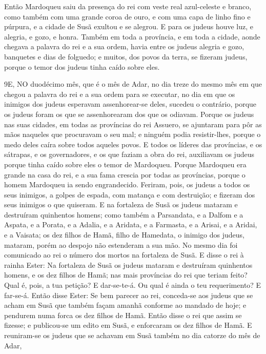 Então Mardoqueu saiu da presença do rei com veste real
azul-celeste e branco, como também com uma grande coroa de ouro, e
com uma capa de linho fino e púrpura, e a cidade de Susã exultou e
se alegrou. E para os judeus houve luz, e alegria, e gozo, e
honra. Também em toda a província, e em toda a cidade, aonde
chegava a palavra do rei e a sua ordem, havia entre os judeus
alegria e gozo, banquetes e dias de folguedo; e muitos, dos povos da
terra, se fizeram judeus, porque o temor dos judeus tinha caído
sobre eles.

\medskip

\lettrine{9} E, NO duodécimo mês, que é o mês de Adar, no dia
treze do mesmo mês em que chegou a palavra do rei e a sua ordem para
se executar, no dia em que os inimigos dos judeus esperavam
assenhorear-se deles, sucedeu o contrário, porque os judeus foram os
que se assenhorearam dos que os odiavam. Porque os judeus nas
suas cidades, em todas as províncias do rei Assuero, se ajuntaram
para pôr as mãos naqueles que procuravam o seu mal; e ninguém podia
resistir-lhes, porque o medo deles caíra sobre todos aqueles povos.
E todos os líderes das províncias, e os sátrapas, e os
governadores, e os que faziam a obra do rei, auxiliavam os judeus
porque tinha caído sobre eles o temor de Mardoqueu. Porque
Mardoqueu era grande na casa do rei, e a sua fama crescia por todas
as províncias, porque o homem Mardoqueu ia sendo engrandecido.
Feriram, pois, os judeus a todos os seus inimigos, a golpes de
espada, com matança e com destruição; e fizeram dos seus inimigos o
que quiseram. E na fortaleza de Susã os judeus mataram e
destruíram quinhentos homens; como também a Parsandata, e a
Dalfom e a Aspata, e a Porata, e a Adalia, e a Aridata, e a
Farmasta, e a Arisai, e a Aridai, e a Vaisata; os dez filhos
de Hamã, filho de Hamedata, o inimigo dos judeus, mataram, porém ao
despojo não estenderam a sua mão. No mesmo dia foi comunicado
ao rei o número dos mortos na fortaleza de Susã. E disse o
rei à rainha Ester: Na fortaleza de Susã os judeus mataram e
destruíram quinhentos homens, e os dez filhos de Hamã; nas mais
províncias do rei que teriam feito? Qual é, pois, a tua petição? E
dar-se-te-á. Ou qual é ainda o teu requerimento? E far-se-á.
Então disse Ester: Se bem parecer ao rei, conceda-se aos
judeus que se acham em Susã que também façam amanhã conforme ao
mandado de hoje; e pendurem numa forca os dez filhos de Hamã.
 Então disse o rei que assim se fizesse; e publicou-se um edito em
Susã, e enforcaram os dez filhos de Hamã. E reuniram-se os
judeus que se achavam em Susã também no dia catorze do mês de Adar,
